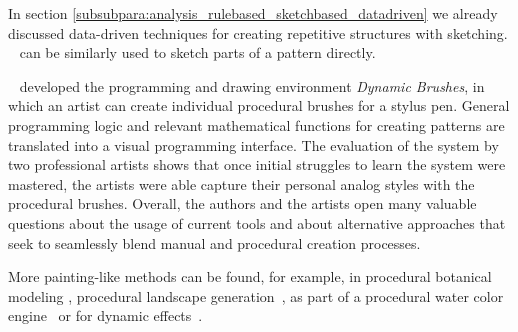 
In section \ref{subsubpara:analysis_rulebased_sketchbased_datadriven} we already discussed data-driven techniques for creating repetitive structures with sketching. ~\cite{kazi_2012_vit, xing_2014_apr, xing_2015_aha} can be similarly used to sketch parts of a pattern directly.






\citeauthor*{jacobs_2018_dbe}~\cite{jacobs_2018_dbe} developed the programming and drawing environment \textit{Dynamic Brushes}, in which an artist can create individual procedural brushes for a stylus pen. General programming logic and relevant mathematical functions for creating patterns are translated into a visual programming interface. The evaluation of the system by two professional artists shows that once initial struggles to learn the system were mastered, the artists were able capture their personal analog styles with the procedural brushes. Overall, the authors and the artists open many valuable questions about the usage of current tools and about alternative approaches that seek to seamlessly blend manual and procedural creation processes.

More painting-like methods can be found, for example, in procedural botanical modeling \cite{anastacio_2008_spl,chen_2008_stm,palubicki_2009_sot}, procedural landscape generation~\cite{emilien_2015_wie}, as part of a procedural water color engine~\cite{diverdi_2013_ppp} or for dynamic effects~\cite{xing_2016_eit}. 







